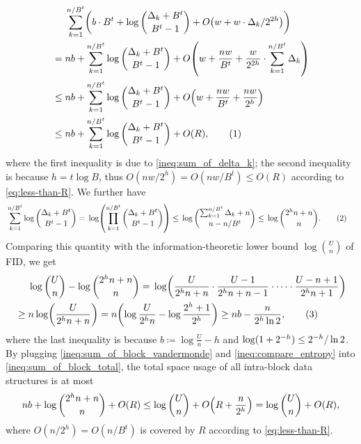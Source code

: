 \documentclass{article}
\theoremstyle{plain}
\theoremstyle{definition}  \newtheorem{definition}[theorem]{Definition}
\DeclarePairedDelimiter{\bk}{(}{)}
\newcommand{\defeq}{\coloneqq}
\newcommand{\numberthis}{\addtocounter{equation}{1}\tag{\theequation}}
\begin{document}
\begin{align*}
    &\sum_{k=1}^{n/B^t} \bk*{b \cdot B^t + \log \binom{\Delta_k + B^t}{B^t - 1} + O\bk*{w + w \cdot \Delta_k / 2^{2h}}}\\
    {}={}& nb + \sum_{k=1}^{n/B^t} \log \binom{\Delta_k + B^t}{B^t - 1} + O\bk*{w + \frac{nw}{B^t} + \frac{w}{2^{2h}} \cdot \sum_{k=1}^{n/B^t} \Delta_k }\\
    {}\le{}& nb + \sum_{k=1}^{n/B^t} \log \binom{\Delta_k + B^t}{B^t - 1} + O\bk*{w + \frac{nw}{B^t} + \frac{nw}{2^{h}}}\\
    {}\le{}& nb + \sum_{k=1}^{n/B^t} \log \binom{\Delta_k + B^t}{B^t - 1} + O\bk*{R},\label{ineq:sum_of_block_total}\numberthis
\end{align*}
where the first inequality is due to \eqref{ineq:sum_of_delta_k}; the second inequality is because $h = t \log B$, thus $O(nw/2^{h}) = O(nw/B^t) \le O(R)$ according to \eqref{eq:less-than-R}.
We further have
\begin{align*}
    \label{ineq:sum_of_block_vandermonde}
    &\sum_{k=1}^{n/B^t} \log \binom{\Delta_k + B^t}{B^t - 1}
    {}={} \log \bk*{\prod_{k=1}^{n/B^t} \binom{\Delta_k + B^t}{B^t - 1}}
    {}\le{} \log \binom{\sum_{k=1}^{n/B^t} \Delta_k + n}{n - n/B^t}
    {}\le{} \log \binom{2^h n + n}{n}.\numberthis
\end{align*}
Comparing this quantity with the information-theoretic lower bound $\log \binom{U}{n}$ of FID, we get
\begin{align*}
    & \log \binom{U}{n} - \log \binom{2^h n + n}{n}
    {}={} \log \bk*{\frac{U}{2^h n + n} \cdot \frac{U - 1}{2^h n + n -1} \cdot \cdots \cdot \frac{U-n+1}{2^h n + 1}}\\
    {}\ge{}& n\log \bk*{\frac{U}{2^h n + n}}
    {}={} n\bk*{\log \frac{U}{2^h n} - \log \frac{2^h + 1}{2^h}}
    {}\ge{} nb - \frac{n}{2^h \ln 2},\label{ineq:compare_entropy}\numberthis
\end{align*}
where the last inequality is because $b \defeq \log \frac{U}{n} - h$ and $\log \bk{1 + 2^{-h}} \le 2^{-h} / \ln 2$. By plugging \eqref{ineq:sum_of_block_vandermonde} and \eqref{ineq:compare_entropy} into \eqref{ineq:sum_of_block_total}, the total space usage of all intra-block data structures is at most
\begin{align*}
    nb + \log \binom{2^h n + n}{n} + O\bk*{R}\le \log \binom{U}{n} + O\bk*{R + \frac{n}{2^h}} 
    = \log \binom{U}{n} + O(R),    
\end{align*}
where $O(n/2^{h}) = O(n/B^t)$ is covered by $R$ according to \eqref{eq:less-than-R}.
\end{document}
